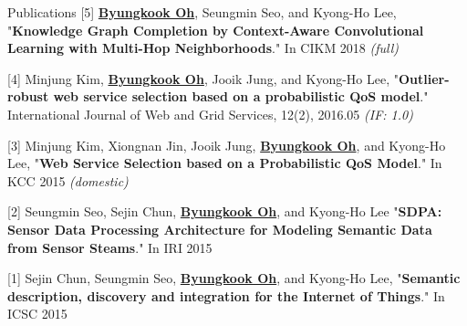 \documentclass{resume} %
\newcommand{\me}[1]{\underline{\textbf{#1}}}  %
\begin{document}
\begin{rSection}{Publications}
		[5] \me{Byungkook Oh}, Seungmin Seo, and Kyong-Ho Lee, "\textbf{Knowledge Graph Completion by Context-Aware Convolutional Learning with Multi-Hop Neighborhoods}." In CIKM 2018 \textit{(full)}

		[4] Minjung Kim, \me{Byungkook Oh}, Jooik Jung, and Kyong-Ho Lee, "\textbf{Outlier-robust web service selection based on a probabilistic QoS model}." International Journal of Web and Grid Services, 12(2), 2016.05 \textit{(IF: 1.0)}
		
		[3] Minjung Kim, Xiongnan Jin, Jooik Jung, \me{Byungkook Oh}, and Kyong-Ho Lee, "\textbf{Web Service Selection based on a Probabilistic QoS Model}." In KCC 2015 \textit{(domestic)}

		[2] Seungmin Seo, Sejin Chun, \me{Byungkook Oh}, and Kyong-Ho Lee "\textbf{SDPA: Sensor Data Processing Architecture for Modeling Semantic Data from Sensor Steams}." In IRI 2015

		[1] Sejin Chun, Seungmin Seo, \me{Byungkook Oh}, and Kyong-Ho Lee, "\textbf{Semantic description, discovery and integration for the Internet of Things}." In ICSC 2015
	\end{rSection}

	\newpage
	
\end{document}
